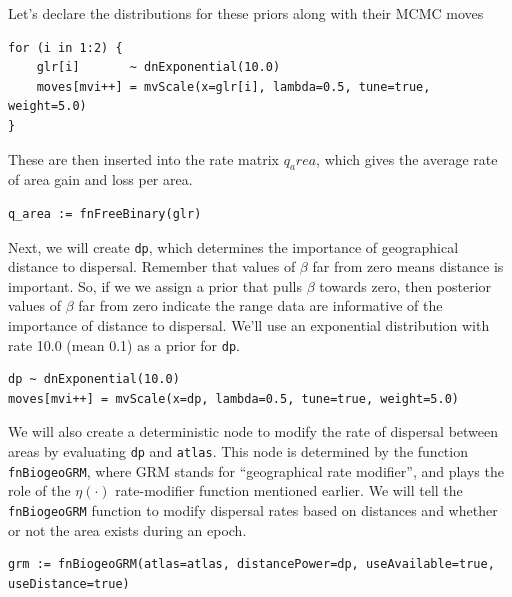 Let's declare the distributions for these priors along with their MCMC moves

\begin{snugshade}
\begin{lstlisting}
for (i in 1:2) {
	glr[i]       ~ dnExponential(10.0)
	moves[mvi++] = mvScale(x=glr[i], lambda=0.5, tune=true, weight=5.0)
}
\end{lstlisting}
\end{snugshade}

These are then inserted into the rate matrix {\tt $q_area$}, which gives the average rate of area gain and loss per area.

\begin{snugshade}
\begin{lstlisting}
q_area := fnFreeBinary(glr)
\end{lstlisting}
\end{snugshade}

Next, we will create {\tt dp}, which determines the importance of geographical distance to dispersal.
Remember that values of $\beta$ far from zero means distance is important.
So, if we we assign a prior that pulls $\beta$ towards zero, then posterior values of $\beta$ far from zero indicate the range data are informative of the importance of distance to dispersal.
We'll use an exponential distribution with rate 10.0 (mean 0.1) as a prior for {\tt dp}.

\begin{snugshade}
\begin{lstlisting}
dp ~ dnExponential(10.0)
moves[mvi++] = mvScale(x=dp, lambda=0.5, tune=true, weight=5.0)
\end{lstlisting}
\end{snugshade}

We will also create a deterministic node to modify the rate of dispersal between areas by evaluating {\tt dp} and {\tt atlas}.
This node is determined by the function {\tt fnBiogeoGRM}, where GRM stands for ``geographical rate modifier'', and plays the role of the $\eta(\cdot)$ rate-modifier function mentioned earlier.
We will tell the {\tt fnBiogeoGRM} function to modify dispersal rates based on distances and whether or not the area exists during an epoch.

\begin{snugshade}
\begin{lstlisting}
grm := fnBiogeoGRM(atlas=atlas, distancePower=dp, useAvailable=true, useDistance=true)
\end{lstlisting}
\end{snugshade}

